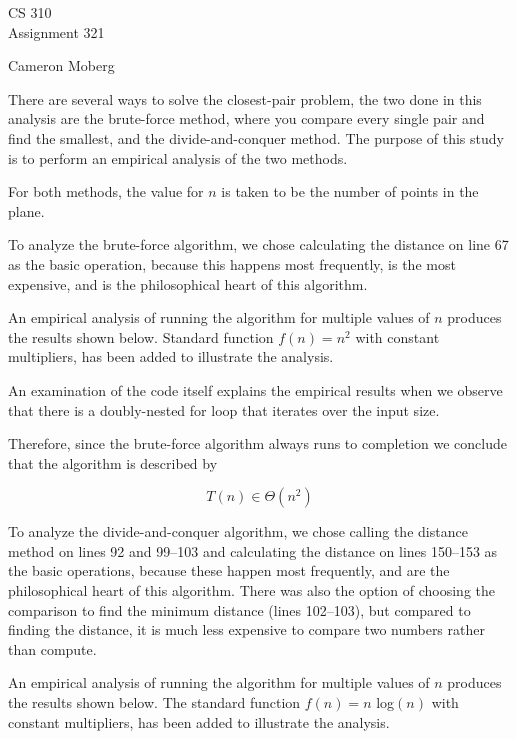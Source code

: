 \documentclass[11pt]{article}
\begin{document}
\thispagestyle{empty}
\begin{center}
{\large CS 310}\\
Assignment 321
\end{center}

\begin{flushright}
Cameron Moberg
\end{flushright}

There are several ways to solve the closest-pair problem, the two done in this analysis are the brute-force method, where you compare every single pair and find the smallest, and the divide-and-conquer method. The purpose of this study is to perform an empirical analysis of the two methods.

For both methods, the value for $n$ is taken to be the number of points in the plane.

To analyze the brute-force algorithm, we chose calculating the distance on line 67 as the basic operation, because this happens most frequently, is the most expensive, and is the philosophical heart of this algorithm.

An empirical analysis of running the algorithm for multiple values of
$n$ produces the results shown below. Standard function $f(n) = n^2$ with constant multipliers, has been added to
illustrate the analysis.

\begin{center}
    
\end{center}

An examination of the code itself explains the empirical results when we observe that there is a doubly-nested for loop that iterates over the input size. 

Therefore, since the brute-force algorithm always runs to completion we conclude that the algorithm is described by

\[
T(n) \in \Theta( n^{2} )
\]

\clearpage
To analyze the divide-and-conquer algorithm, we chose calling the distance method on lines 92 and 99--103 and calculating the distance on lines 150--153 as the basic operations, because these happen most frequently, and are the philosophical heart of this algorithm. There was also the option of choosing the comparison to find the minimum distance (lines 102--103), but compared to finding the distance, it is much less expensive to compare two numbers rather than compute.

An empirical analysis of running the algorithm for multiple values of
$n$ produces the results shown below. The standard function $f(n) = n$ log$(n)$ with constant multipliers, has been added to
illustrate the analysis.
\end{document}
